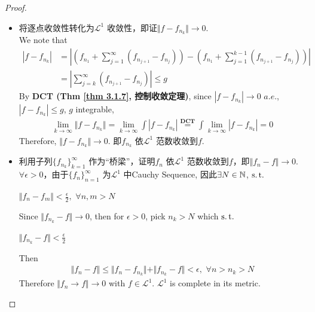\begin{thm}
\begin{proof}
\begin{itemize}
				\vspace{4em}
				\item 将逐点收敛性转化为$\mathcal{L}^1$ 收敛性，即证$\Vert f - f_{n_k} \Vert \to 0$. \\
				We note that
				\begin{align}
					\left| f - f_{n_k} \right|
					&= \left| \left( f_{n_1} + \sum_{j = 1}^{\infty}{(f_{n_{j + 1}} - f_{n_j})} \right) - \left( f_{n_1} + \sum_{j = 1}^{k - 1}{(f_{n_{j + 1}} - f_{n_j})} \right) \right| \\
					&=\left| \sum_{j = k}^{\infty}{(f_{n_{j + 1}} - f_{n_j})} \right| 
					\leq g
				\end{align}
				By \textbf{DCT (Thm \ref{thm 3.1.7}, 控制收敛定理)}, since $\left| f - f_{n_k} \right| \to 0 \,\, a.e.$, $\left| f - f_{n_k} \right| \leq g$, $g$ integrable,
				\begin{align}
					\lim_{k \to \infty}{\Vert f - f_{n_k} \Vert}
					= \lim_{k \to \infty}{\int{\left| f - f_{n_k} \right|}}
					\overset{\textbf{DCT}}{=} \int{\lim_{k \to \infty}{\left| f - f_{n_k} \right|}}
					= 0
				\end{align}
				Therefore, $\Vert f - f_{n_k} \Vert \to 0$. 即$f_{n_k}$ 依$\mathcal{L}^1$ 范数收敛到$f$.
				
				\newpage
				\item 利用子列$\{ f_{n_k} \}_{k = 1}^{\infty}$ 作为“桥梁”，证明$f_n$ 依$\mathcal{L}^1$ 范数收敛到$f$，即$\Vert f_n - f \Vert \to 0$. \\
				$\forall \epsilon > 0$，由于$\{ f_n \}_{n = 1}^{\infty}$ 为$\mathcal{L}^1$ 中Cauchy Sequence, 因此$\exists N \in \mathbb{N}$, $\operatorname{s.t.}$
				\begin{center}
					$\Vert f_n - f_m \Vert < \frac{\epsilon}{2} , \,\, \forall n , m > N$
				\end{center}
				Since $\Vert f_{n_k} - f \Vert \to 0$, then for $\epsilon > 0$, pick $n_k > N$ which $\operatorname{s.t.}$
				\begin{center}
					$\Vert f_{n_k} - f \Vert < \frac{\epsilon}{2}$
				\end{center}
				Then
				\begin{align}
					\Vert f_n - f \Vert 
					\leq \Vert f_n - f_{n_k} \Vert + \Vert f_{n_k} - f \Vert
					< \epsilon , \,\, \forall n > n_k > N
				\end{align}
				Therefore $\Vert f_n \to f \Vert \to 0$ with $f \in \mathcal{L}^1$. $\mathcal{L}^1$ is complete in its metric.
			\end{itemize}
		\end{proof}
	\end{thm}

